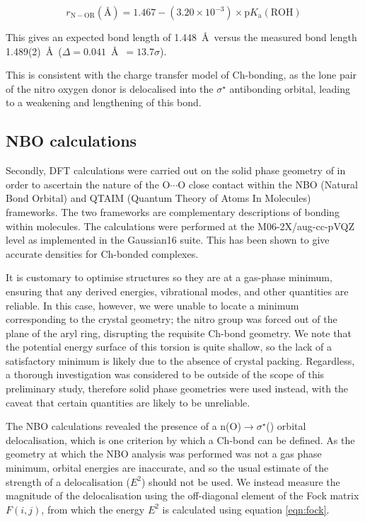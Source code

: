 \begin{refsection}
\begin{equation}
	r_{\mathrm{N-OR}} (\text{\AA}) = 1.467 - (3.20\times10^{-3}) \times \mathrm{p}K_{\mathrm{a}}(\mathrm{ROH})
	\label{eqn:scp}
\end{equation}

This gives an expected bond length of 1.448~\AA~versus the measured bond length 1.489(2)~\AA~($\Delta = 0.041$~\AA~$= 13.7\sigma$).

This is consistent with the charge transfer model of Ch-bonding, as the lone pair of the nitro oxygen donor is delocalised into the $\sigma^{\star}$ antibonding orbital, leading to a weakening and lengthening of this bond.\autocite{Reed1988}

\subsection{NBO calculations}
Secondly, DFT calculations were carried out on the solid phase geometry of  in order to ascertain the nature of the O$\cdots$O close contact within the NBO (Natural Bond Orbital) and QTAIM (Quantum Theory of Atoms In Molecules) frameworks.\autocite{Bader1991,NBO7}
The two frameworks are complementary descriptions of bonding within molecules.
The calculations were performed at the M06-2X/aug-cc-pVQZ level as implemented in the Gaussian16 suite.\autocite{gaussian16,Zhao2008,Woon1995}
This has been shown to give accurate densities for Ch-bonded complexes.\autocite{Kim2019}

It is customary to optimise structures so they are at a gas-phase minimum, ensuring that any derived energies, vibrational modes, and other quantities are reliable. 
In this case, however, we were unable to locate a minimum corresponding to the crystal geometry; the nitro group was forced out of the plane of the aryl ring, disrupting the requisite Ch-bond geometry.
We note that the potential energy surface of this torsion is quite shallow, so the lack of a satisfactory minimum is likely due to the absence of crystal packing.
Regardless, a thorough investigation was considered to be outside of the scope of this preliminary study, therefore solid phase geometries were used instead, with the caveat that certain quantities are likely to be unreliable.

The NBO calculations revealed the presence of a n(O)$\rightarrow \sigma^{\star}$() orbital delocalisation, which is one criterion by which a Ch-bond can be defined.\autocite{Pascoe2017}
As the geometry at which the NBO analysis was performed was not a gas phase minimum, orbital energies are inaccurate, and so the usual estimate of the strength of a delocalisation ($E^2$) should not be used.
We instead measure the magnitude of the delocalisation using the off-diagonal element of the Fock matrix $F(i,j)$, from which the energy $E^2$ is calculated using equation \ref{eqn:fock}.


\end{refsection}
